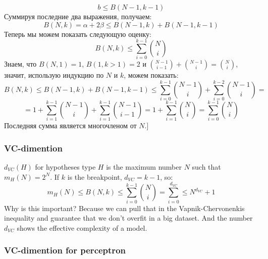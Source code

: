$$b\le B(N-1,k-1)$$
Суммируя последние два выражения, получаем:
$$B(N,k)=\alpha+2\beta\le B(N-1, k)+B(N-1,k-1)$$
Теперь мы можем показать следующую оценку:
$$B(N,k)\le\sum\limits_{i=0}^{k-1}\binom{N}{i}$$
Знаем, что $B(N,1)=1$, $B(1,k>1)=2$ и $\binom{N-1}{i-1}+\binom{N-1}{i}=\binom{N}{i}$, значит, использую индукцию по $N$ и $k$, можем показать:
$$B(N,k)\le B(N-1,k)+B(N-1,k-1)\le\sum\limits_{i=0}^{k-1}\binom{N-1}{i}+\sum\limits_{i=0}^{k-2}\binom{N-1}{i}=$$ $$=1+\sum\limits_{i=1}^{k-1}\binom{N-1}{i}+\sum\limits_{i=1}^{k-1}\binom{N-1}{i-1}=1+\sum\limits_{i=1}^{k-1}\binom{N}{i}=\sum\limits_{i=0}^{k-1}\binom{N}{i}$$
Последняя сумма является многочленом от $N$.]

\subsubsection*{VC-dimention}

$d_{VC}(H)$ for hypotheses type $H$ is the maximum number $N$ such that $m_H(N)=2^N$. If $k$ is the breakpoint, $d_{VC}=k-1$, so:
$$m_H(N)\le B(N,k)\le\sum\limits_{i=0}^{k-1}\binom{N}{i}=\sum\limits_{i=0}^{d_{VC}}\le N^{d_{VC}}+1$$
Why is this important? Because we can pull that in the Vapnik-Chervonenkis inequality and guarantee that we don't overfit in a big dataset. And the number $d_{VC}$ shows the effective complexity of a model.

\subsubsection*{VC-dimention for perceptron}

